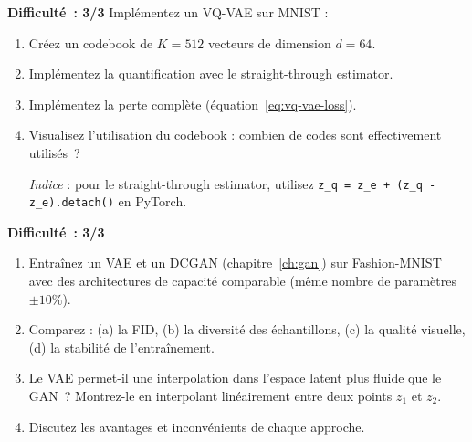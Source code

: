 \begin{exercice}
\label{exo:vq-vae-impl}
\textbf{Difficult\'e~: 3/3}
Impl\'ementez un VQ-VAE sur MNIST :
\begin{enumerate}
    \item Cr\'eez un codebook de $K=512$ vecteurs de dimension $d=64$.
    \item Impl\'ementez la quantification avec le straight-through estimator.
    \item Impl\'ementez la perte compl\`ete (\'equation~\eqref{eq:vq-vae-loss}).
    \item Visualisez l'utilisation du codebook : combien de codes sont effectivement utilis\'es~?

\emph{Indice} : pour le straight-through estimator, utilisez \texttt{z\_q = z\_e + (z\_q - z\_e).detach()} en PyTorch.
\end{enumerate}
\end{exercice}

\begin{exercice}
\label{exo:vae-vs-gan}
\textbf{Difficult\'e~: 3/3}
\begin{enumerate}
    \item Entra\^inez un VAE et un DCGAN (chapitre~\ref{ch:gan}) sur Fashion-MNIST avec des architectures de capacit\'e comparable (m\^eme nombre de param\`etres $\pm 10\%$).
    \item Comparez : (a) la FID, (b) la diversit\'e des \'echantillons, (c) la qualit\'e visuelle, (d) la stabilit\'e de l'entra\^inement.
    \item Le VAE permet-il une interpolation dans l'espace latent plus fluide que le GAN~? Montrez-le en interpolant lin\'eairement entre deux points $z_1$ et $z_2$.
    \item Discutez les avantages et inconv\'enients de chaque approche.
\end{enumerate}
\end{exercice}
